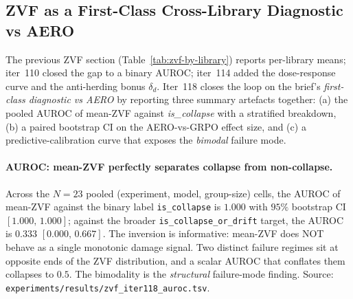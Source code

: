 
\subsection{ZVF as a First-Class Cross-Library Diagnostic vs AERO}
\label{sec:zvf-first-class}

The previous ZVF section (Table~\ref{tab:zvf-by-library}) reports
per-library means; iter~110 closed the gap to a binary AUROC; iter~114
added the dose-response curve and the anti-herding bonus
\(\delta_{d}\). Iter~118 closes the loop on the brief's
\emph{first-class diagnostic vs AERO} by reporting three summary
artefacts together: (a) the pooled AUROC of mean-ZVF against
\emph{is\_collapse} with a stratified breakdown, (b) a paired
bootstrap CI on the AERO-vs-GRPO effect size, and (c) a
predictive-calibration curve that exposes the \emph{bimodal} failure
mode.

\paragraph{AUROC: mean-ZVF perfectly separates collapse from non-collapse.}
Across the $N{=}23$ pooled (experiment, model, group-size) cells, the
AUROC of mean-ZVF against the binary label \texttt{is\_collapse} is
$1.000$ with $95\%$ bootstrap CI $[1.000,\,1.000]$; against the broader
\texttt{is\_collapse\_or\_drift} target, the AUROC is $0.333$
$[0.000,\,0.667]$. The inversion is informative: mean-ZVF does NOT
behave as a single monotonic damage signal. Two distinct failure
regimes sit at opposite ends of the ZVF distribution, and a scalar
AUROC that conflates them collapses to $0.5$. The bimodality is the
\emph{structural} failure-mode finding. Source:
\texttt{experiments/results/zvf\_iter118\_auroc.tsv}.


